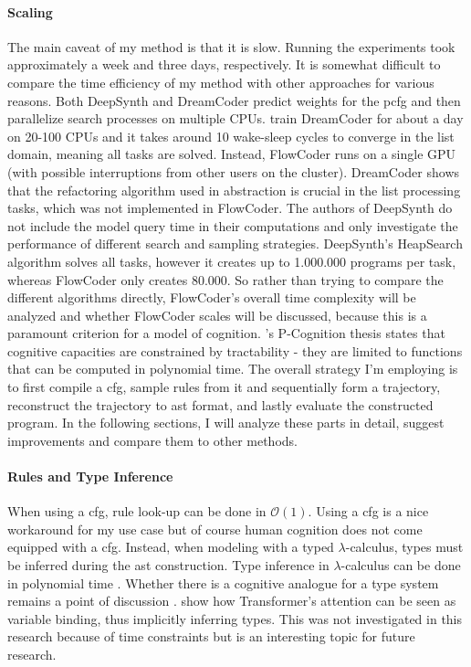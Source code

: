 \paragraph*{Scaling}
The main caveat of my method is that it is slow. Running the experiments took approximately a week and three days, respectively. 
It is somewhat difficult to compare the time efficiency of my method with other approaches for various reasons. 
Both DeepSynth and DreamCoder predict weights for the \acrshort{pcfg} and then parallelize search processes on multiple CPUs. \citet{ellisDreamCoderBootstrappingInductive2021} train DreamCoder for about a day on 20-100 CPUs and it takes around 10 wake-sleep cycles to converge in the list domain, meaning all tasks are solved. Instead, FlowCoder runs on a single GPU (with possible interruptions from other users on the cluster). DreamCoder shows that the refactoring algorithm used in abstraction is crucial in the list processing tasks, which was not implemented in FlowCoder.
The authors of DeepSynth do not include the model query time in their computations and only investigate the performance of different search and sampling strategies. DeepSynth's HeapSearch algorithm solves all tasks, however it creates up to 1.000.000 programs per task, whereas FlowCoder only creates 80.000.
So rather than trying to compare the different algorithms directly, FlowCoder's overall time complexity will be analyzed and whether FlowCoder scales will be discussed, because this is a paramount criterion for a model of cognition. 
\citeauthor{vanrooijTractableCognitionThesis2008}'s \cite{vanrooijTractableCognitionThesis2008} P-Cognition thesis states that cognitive capacities are constrained by tractability - they are limited to functions that can be computed in polynomial time.
The overall strategy I'm employing is to first compile a \acrshort{cfg}, sample rules from it and sequentially form a trajectory, reconstruct the trajectory to \acrshort{ast} format, and lastly evaluate the constructed program. In the following sections, I will analyze these parts in detail, suggest improvements and compare them to other methods.
 
\paragraph*{Rules and Type Inference} \label{par:rules_type}
When using a \acrshort{cfg}, rule look-up can be done in $\mathcal{O}(1)$. Using a \acrshort{cfg} is a nice workaround for my use case but of course human cognition does not come equipped with a \acrshort{cfg}. Instead, when modeling with a typed $\lambda$-calculus, types must be inferred during the \acrshort{ast} construction. Type inference in $\lambda$-calculus can be done in polynomial time \cite{mairsonLinearLambdaCalculus}.
Whether there is a cognitive analogue for a type system remains a point of discussion \cite{ruleChildHacker2020}. \citet{goyalInductiveBiasesDeep2022} show how Transformer's attention can be seen as variable binding, thus implicitly inferring types. This was not investigated in this research because of time constraints but is an interesting topic for future research.

